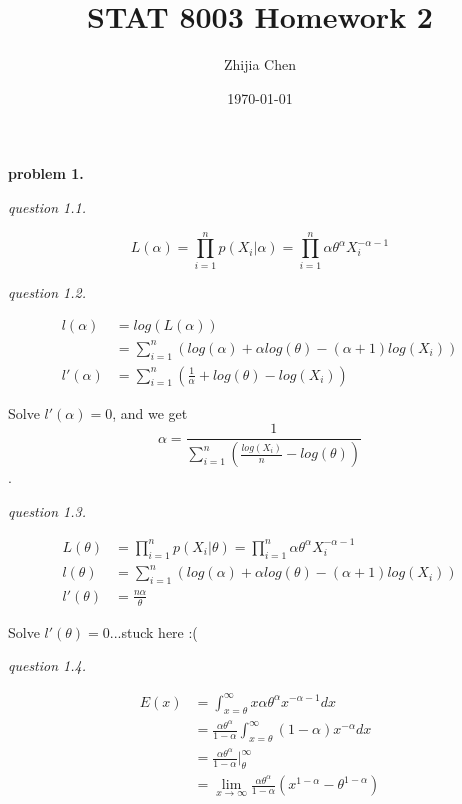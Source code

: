 \documentclass{article}
\title{STAT 8003 Homework 2}
\author{Zhijia Chen}
\date{\today}
\begin{document}
\begin{titlepage}
    \maketitle
\end{titlepage}

\textbf{problem 1.}

\vspace{\baselineskip}
\textit{question 1.1.}

$$L(\alpha)=\prod_{i=1}^np(X_i|\alpha)=\prod_{i=1}^n\alpha\theta^\alpha X_i^{-\alpha-1}$$

\vspace{\baselineskip}
\textit{question 1.2.}

\begin{align*}
    l(\alpha)&=log(L(\alpha))\\
             &=\sum_{i=1}^n \left(log(\alpha)+\alpha log(\theta)-(\alpha+1)log(X_i)\right)\\
    l'(\alpha)&=\sum_{i=1}^n \left(\frac{1}{\alpha}+log(\theta)-log(X_i)\right)
\end{align*}

Solve $l'(\alpha)=0$, and we get $$\alpha=\frac{1}{\sum_{i=1}^n\left(\frac{log(X_i)}{n}-log(\theta)\right)}$$.

\vspace{\baselineskip}
\textit{question 1.3.}

\begin{align*}
    L(\theta)&=\prod_{i=1}^np(X_i|\theta)=\prod_{i=1}^n\alpha\theta^\alpha X_i^{-\alpha-1}\\
    l(\theta)&=\sum_{i=1}^n \left(log(\alpha)+\alpha log(\theta)-(\alpha+1)log(X_i)\right)\\
    l'(\theta)&=\frac{n\alpha}{\theta}
\end{align*}

Solve $l'(\theta)=0$...stuck here :(

\vspace{\baselineskip}
\textit{question 1.4.}

\begin{align*}
    E(x)&=\int_{x=\theta}^\infty x\alpha \theta^\alpha x^{-\alpha-1}dx\\
    &=\frac{\alpha\theta^\alpha}{1-\alpha}\int_{x=\theta}^\infty (1-\alpha)x^{-\alpha}dx\\
    &=\frac{\alpha\theta^\alpha}{1-\alpha}\bigg|_{\theta}^{\infty}\\
    &=\lim_{x\to\infty}\frac{\alpha\theta^\alpha}{1-\alpha}\left(x^{1-\alpha}-\theta^{1-\alpha}\right) 
\end{align*}
\end{document}
